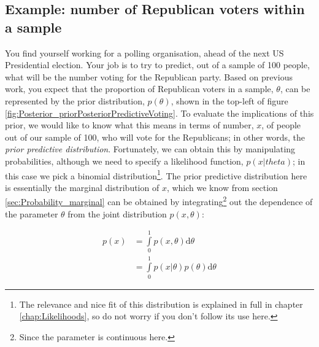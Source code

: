 \documentclass[11pt,fullpage]{book}
\begin{document}
\subsection{Example: number of Republican voters within a sample}
You find yourself working for a polling organisation, ahead of the next US Presidential election. Your job is to try to predict, out of a sample of 100 people, what will be the number voting for the Republican party. Based on previous work, you expect that the proportion of Republican voters in a sample, $\theta$, can be represented by the prior distribution, $p(\theta)$, shown in the top-left of figure \ref{fig:Posterior_priorPosteriorPredictiveVoting}. To evaluate the implications of this prior, we would like to know what this means in terms of number, $x$, of people out of our sample of 100, who will vote for the Republicans; in other words, the \textit{prior predictive distribution}. Fortunately, we can obtain this by manipulating probabilities, although we need to specify a likelihood function, $p(x|theta)$; in this case we pick a binomial distribution\footnote{The relevance and nice fit of this distribution is explained in full in chapter \ref{chap:Likelihoods}, so do not worry if you don't follow its use here.}. The prior predictive distribution here is essentially the marginal distribution of $x$, which we know from section \ref{sec:Probability_marginal} can be obtained by integrating\footnote{Since the parameter is continuous here.} out the dependence of the parameter $\theta$ from the joint distribution $p(x,\theta)$:

\begin{equation}\label{eq:Posterior_priorPredictiveVoting}
\begin{align}
p(x) &= \int\limits_{0}^{1} p(x,\theta) \mathrm{d}\theta\\
&= \int\limits_{0}^{1} p(x|\theta) p(\theta) \mathrm{d}\theta
\end{align}
\end{equation}
\end{document}
